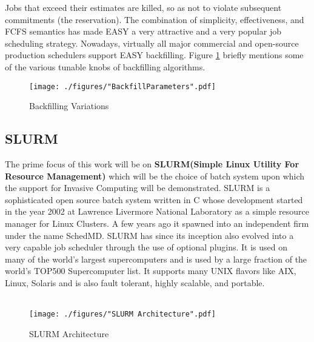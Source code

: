 Jobs that exceed their estimates are killed, so as not to violate subsequent commitments (the reservation). The combination of simplicity, effectiveness, and FCFS semantics has made EASY a very attractive and a very popular job scheduling strategy. Nowadays, virtually all major commercial and open-source production schedulers support EASY backfilling. Figure \ref{fig:3} briefly mentions some of the various tunable knobs of backfilling algorithms.
\begin{figure}[!htbp]
\centering
\texttt{[image: ./figures/"BackfillParameters".pdf]}
\caption{Backfilling Variations\cite{tsafrir}}
\label{fig:3}
\end{figure}
\subsection{SLURM}
The prime focus of this work will be on \textbf{SLURM(Simple Linux Utility For Resource Management)}\cite{jette}\cite{slurm} which will be the choice of batch system upon which the support for Invasive Computing will be demonstrated. SLURM is a sophisticated open source batch system written in C whose development started in the year 2002 at Lawrence Livermore National Laboratory as a simple resource manager for Linux Clusters. A few years ago it spawned into an independent firm under the name SchedMD. SLURM has since its inception also evolved into a very capable job scheduler through the use of optional plugins. It is used on many of the world's largest supercomputers and is used by a large fraction of the world's TOP500 Supercomputer list. It supports many UNIX flavors like AIX, Linux, Solaris and is also fault tolerant, highly scalable, and portable.\\ \\
\begin{figure}[!ht]
\centering
\texttt{[image: ./figures/"SLURM Architecture".pdf]}
\caption{SLURM Architecture}
\label{fig:6}
\end{figure}
\noindent
